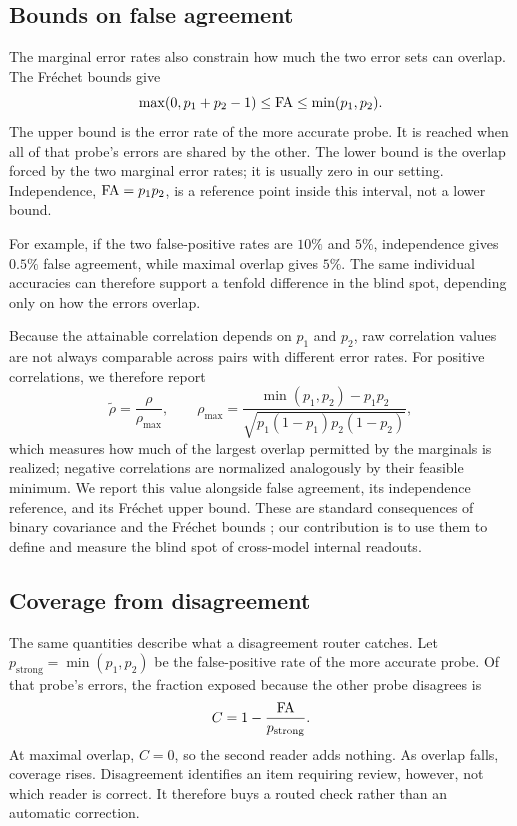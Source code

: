 \subsection{Bounds on false agreement}
\label{sec:theory:bounds}

The marginal error rates also constrain how much the two error sets can overlap.
The Fr\'echet bounds give
\begin{equation}
  \max(0,p_1+p_2-1)
  \leq \mathrm{FA}
  \leq \min(p_1,p_2).
  \label{eq:frechet}
\end{equation}
The upper bound is the error rate of the more accurate probe. It is reached when
all of that probe's errors are shared by the other. The lower bound is the
overlap forced by the two marginal error rates; it is usually zero in our
setting. Independence, $\mathrm{FA}=p_1p_2$, is a reference point inside this interval,
not a lower bound.

For example, if the two false-positive rates are $10\%$ and $5\%$, independence
gives $0.5\%$ false agreement, while maximal overlap gives $5\%$. The same
individual accuracies can therefore support a tenfold difference in the blind
spot, depending only on how the errors overlap.

Because the attainable correlation depends on $p_1$ and $p_2$, raw correlation
values are not always comparable across pairs with different error rates. For
positive correlations, we therefore report
\begin{equation}
  \tilde{\rho}=\frac{\rho}{\rho_{\max}},
  \qquad
  \rho_{\max}
  =\frac{\min(p_1,p_2)-p_1p_2}
  {\sqrt{p_1(1-p_1)p_2(1-p_2)}},
  \label{eq:rhonorm}
\end{equation}
which measures how much of the largest overlap permitted by the marginals is
realized; negative correlations are normalized analogously by their feasible
minimum. We report this value alongside false agreement, its independence
reference, and its Fr\'echet upper bound. These are standard consequences of
binary covariance and the Fr\'echet bounds \citep{frechet1951tableaux}; our
contribution is to use them to define and measure the blind spot of cross-model
internal readouts.

\subsection{Coverage from disagreement}
\label{sec:theory:coverage}

The same quantities describe what a disagreement router catches. Let
$p_{\mathrm{strong}}=\min(p_1,p_2)$ be the false-positive rate of the more
accurate probe. Of that probe's errors, the fraction exposed because the other
probe disagrees is
\begin{equation}
  C=1-\frac{\mathrm{FA}}{p_{\mathrm{strong}}}.
  \label{eq:coverage}
\end{equation}
At maximal overlap, $C=0$, so the second reader adds nothing. As overlap falls,
coverage rises. Disagreement identifies an item requiring review, however, not
which reader is correct. It therefore buys a routed check rather than an
automatic correction.
